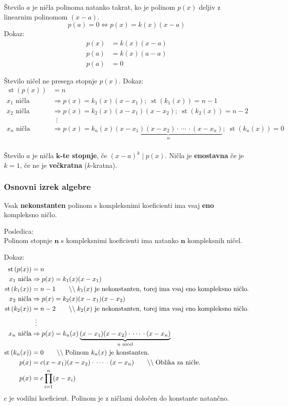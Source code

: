 \documentclass[a4paper,oneside,12pt,fleqn]{article}
\newcommand\krat\cdot
\newcommand{\comment}[1]{\ensuremath{\qquad\backslash\backslash\;}\textnormal{#1}}
\newcommand{\st}{\ensuremath{\operatorname{st}}} %
\renewcommand\implies\Rightarrow
\renewcommand\iff\Leftrightarrow
\numberwithin{equation}{section}
\begin{document}
Število $a$ je ničla polinoma natanko takrat, ko je polinom $p(x)$ deljiv z linearnim
polinomom $(x-a)$.
\[ p(a) = 0 \iff p(x) = k(x)(x-a) \]
Dokaz:
\begin{align*}
  p(x) &= k(x)(x-a) \\
  p(a) &= k(x)(a-a) \\
  p(a) &= 0
\end{align*}

Število ničel ne presega stopnje $p(x)$. Dokaz:
\begin{align*}
  \st\left( p(x) \right) &= n \\
  x_1 \text{ ničla} &\implies p(x) = k_1(x)(x-x_1); \; \st\left( k_1(x) \right) = n-1 \\
  x_2 \text{ ničla} &\implies p(x) = k_2(x)(x-x_1)(x-x_2); \; \st\left( k_2(x) \right) = n-2 \\
  & \;\; \vdots \\
  x_n \text{ ničla} &\implies p(x) =
  k_n(x)\underbrace{(x-x_1)(x-x_2)\krat\,\cdots\,\krat(x-x_n)}_{n}; \; \st\left( k_n(x) \right) = 0 \\
\end{align*}

Število $a$ je ničla \textbf{$\boldsymbol k$-te stopnje}, če $(x-a)^k\;|\;p(x)$. Ničla je
\textbf{enostavna} če je $k = 1$, če ne je \textbf{večkratna} ($k$-kratna).

\subsubsection{Osnovni izrek algebre}
\label{sec:pol:nic:osnalg}
Vsak \textbf{nekonstanten} polinom s kompleksnimi koeficienti ima vsaj \textbf{eno} kompleksno ničlo.

Posledica:\\
Polinom stopnje $\boldsymbol n$ s kompleksnimi koeficienti ima natanko $\boldsymbol n$ kompleksnih ničel.

Dokaz:
\begin{align*}
  \st\left( p(x) \right) &= n \\
  x_1 \text{ ničla} &\implies p(x) = k_1(x)(x-x_1) \\
  \st\left( k_1(x) \right) &= n-1 \comment{$k_1(x)$ je nekonstanten, torej ima
  vsaj eno kompleksno ničlo.} \\
  x_2 \text{ ničla} &\implies p(x) = k_2(x)(x-x_1)(x-x_2) \\
  \st\left( k_2(x) \right) &= n-2 \comment{$k_2(x)$ je nekonstanten, torej ima
  vsaj eno kompleksno ničlo.} \\
  & \;\; \vdots \\
  x_n \text{ ničla} &\implies p(x) =
  k_n(x)\underbrace{(x-x_1)(x-x_2)\krat\,\cdots\,\krat(x-x_n)}_{n \text{ ničel}} \\
  \st\left( k_n(x) \right) &= 0 \comment{Polinom $k_n(x)$ je konstanten.} \\
  p(x) &= c(x-x_1)(x-x_2)\krat\,\cdots\,\krat(x-x_n) \comment{Oblika za ničle.} \\ 
  p(x) &= c\prod_{i=1}^{n}(x-x_i)
\end{align*}
$c$ je vodilni koeficient. Polinom je z ničlami določen do konstante natančno.
\end{document}
